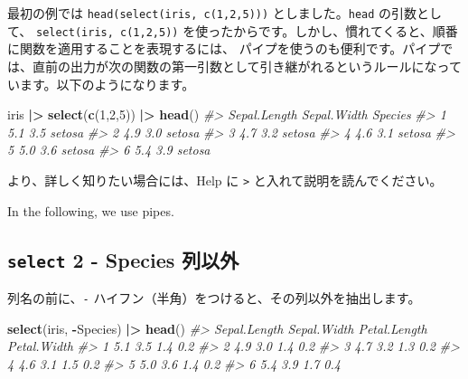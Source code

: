 \documentclass[
  xelatex, ja=standard]{bxjsbook}
\newenvironment{Shaded}{\begin{snugshade}}{\end{snugshade}}
\newcommand{\CommentTok}[1]{\textcolor[rgb]{0.56,0.35,0.01}{\textit{#1}}}
\newcommand{\DecValTok}[1]{\textcolor[rgb]{0.00,0.00,0.81}{#1}}
\newcommand{\FunctionTok}[1]{\textcolor[rgb]{0.13,0.29,0.53}{\textbf{#1}}}
\newcommand{\NormalTok}[1]{#1}
\newcommand{\SpecialCharTok}[1]{\textcolor[rgb]{0.81,0.36,0.00}{\textbf{#1}}}
\theoremstyle{definition}
\theoremstyle{definition}
\theoremstyle{definition}
\theoremstyle{definition}
\theoremstyle{remark}
\begin{document}
最初の例では \texttt{head(select(iris,\ c(1,2,5)))} としました。\texttt{head} の引数として、 \texttt{select(iris,\ c(1,2,5))} を使ったからです。しかし、慣れてくると、順番に関数を適用することを表現するには、 パイプを使うのも便利です。パイプでは、直前の出力が次の関数の第一引数として引き継がれるというルールになっています。以下のようになります。

\begin{Shaded}
\begin{Highlighting}[]
\NormalTok{iris }\SpecialCharTok{|\textgreater{}} \FunctionTok{select}\NormalTok{(}\FunctionTok{c}\NormalTok{(}\DecValTok{1}\NormalTok{,}\DecValTok{2}\NormalTok{,}\DecValTok{5}\NormalTok{)) }\SpecialCharTok{|\textgreater{}} \FunctionTok{head}\NormalTok{()}
\CommentTok{\#\textgreater{}   Sepal.Length Sepal.Width Species}
\CommentTok{\#\textgreater{} 1          5.1         3.5  setosa}
\CommentTok{\#\textgreater{} 2          4.9         3.0  setosa}
\CommentTok{\#\textgreater{} 3          4.7         3.2  setosa}
\CommentTok{\#\textgreater{} 4          4.6         3.1  setosa}
\CommentTok{\#\textgreater{} 5          5.0         3.6  setosa}
\CommentTok{\#\textgreater{} 6          5.4         3.9  setosa}
\end{Highlighting}
\end{Shaded}

より、詳しく知りたい場合には、Help に \texttt{\textbar{}\textgreater{}} と入れて説明を読んでください。

In the following, we use pipes.

\hypertarget{select-2---species-ux5217ux4ee5ux5916}{%
\subsection{\texorpdfstring{\texttt{select} 2 - Species 列以外}{select 2 - Species 列以外}}\label{select-2---species-ux5217ux4ee5ux5916}}

列名の前に、\texttt{-} ハイフン（半角）をつけると、その列以外を抽出します。

\begin{Shaded}
\begin{Highlighting}[]
\FunctionTok{select}\NormalTok{(iris, }\SpecialCharTok{{-}}\NormalTok{Species) }\SpecialCharTok{|\textgreater{}} \FunctionTok{head}\NormalTok{()}
\CommentTok{\#\textgreater{}   Sepal.Length Sepal.Width Petal.Length Petal.Width}
\CommentTok{\#\textgreater{} 1          5.1         3.5          1.4         0.2}
\CommentTok{\#\textgreater{} 2          4.9         3.0          1.4         0.2}
\CommentTok{\#\textgreater{} 3          4.7         3.2          1.3         0.2}
\CommentTok{\#\textgreater{} 4          4.6         3.1          1.5         0.2}
\CommentTok{\#\textgreater{} 5          5.0         3.6          1.4         0.2}
\CommentTok{\#\textgreater{} 6          5.4         3.9          1.7         0.4}
\end{Highlighting}
\end{Shaded}
\end{document}
